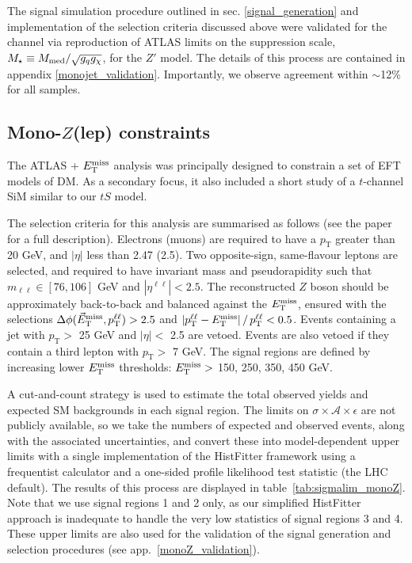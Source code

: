 The signal simulation procedure outlined in sec. \ref{signal_generation} and implementation of the selection criteria discussed above were validated for the \monojet channel via reproduction of ATLAS limits on the suppression scale, $M_{\star} \equiv M_{\mathrm{med}} / \sqrt{g_q g_{\chi}}$, for the $Z'$ model. The details of this process are contained in appendix \ref{monojet_validation}. Importantly, we observe agreement within $\sim$12\% for all samples.

\subsection{Mono-$Z$(lep) constraints}
\label{monoZ_constraints}
The ATLAS \monoZ + $E_{\mathrm{T}}^{\mathrm{miss}}$ analysis \cite{Aad:2014monoZlep} was principally designed to constrain a set of EFT models of DM. As a secondary focus, it also included a short study of a $t$-channel SiM similar to our $tS$ model.

The selection criteria for this analysis are summarised as follows (see the paper for a full description). Electrons (muons) are required to have a $p_{\mathrm{T}}$ greater than 20 GeV, and $|\eta|$ less than 2.47 (2.5). Two opposite-sign, same-flavour leptons are selected, and required to have invariant mass and pseudorapidity such that $m_{\ell \ell} \in [76, 106]$ GeV and $|\eta^{\ell \ell}| < 2.5$. The reconstructed $Z$ boson should be approximately back-to-back and balanced against the $E_{\mathrm{T}}^{\mathrm{miss}}$, ensured with the selections $\Delta \phi (\vec{E}_{\mathrm{T}}^{\mathrm{miss}}, p_{\mathrm{T}}^{\ell \ell}) > 2.5$ and $| p_{\mathrm{T}}^{\ell \ell} - E_{\mathrm{T}}^{\mathrm{miss}} | \, /  \, p_{\mathrm{T}}^{\ell \ell} < 0.5$. Events containing a jet with $p_{\mathrm{T}}>$ 25 GeV and $|\eta|< $ 2.5 are vetoed. Events are also vetoed if they contain a third lepton with $p_{\mathrm{T}}>$ 7 GeV. The signal regions are defined by increasing lower $E_{\mathrm{T}}^{\mathrm{miss}}$ thresholds: $E_{\mathrm{T}}^{\mathrm{miss}} >$ 150, 250, 350, 450 GeV.

A cut-and-count strategy is used to estimate the total observed yields and expected SM backgrounds in each signal region. The limits on $\sigma\times\mathcal{A}\times\epsilon$ are not publicly available, so we take the numbers of expected and observed events, along with the associated uncertainties, and convert these into model-dependent upper limits with a single implementation of the HistFitter framework \cite{HistFitter} using a frequentist calculator and a one-sided profile likelihood test statistic (the LHC default). The results of this process are displayed in table~\ref{tab:sigmalim_monoZ}. Note that we use signal regions 1 and 2 only, as our simplified HistFitter approach is inadequate to handle the very low statistics of signal regions 3 and 4. These upper limits are also used for the validation of the \monoZ signal generation and selection procedures (see app.~\ref{monoZ_validation}).

